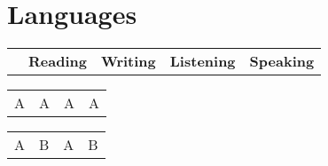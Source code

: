 


\section{Languages}

\begin{tabular}
    {
        p{66mm} p{28mm} p{28mm} p{28mm} p{28mm}
    }
    \textbf{} & \textbf{Reading} & \textbf{Writing} & \textbf{Listening} & \textbf{Speaking}
\end{tabular}

    {
	    \begin{tabular}
	        {
	            p{28mm} p{28mm} p{28mm} p{28mm}
	        }
	        A & A & A & A
	    \end{tabular}
	}

    {
	    \begin{tabular}
	        {
	            p{28mm} p{28mm} p{28mm} p{28mm}
            }
		    A & B & A & B
	    \end{tabular}
    }
